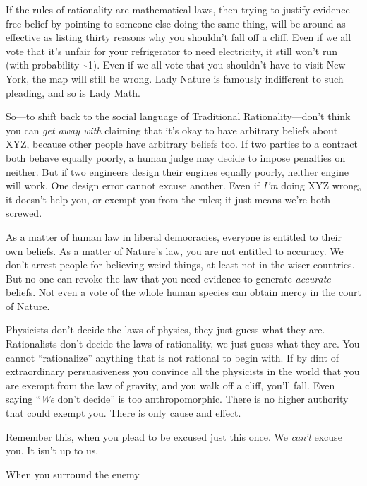 {
 If the rules of rationality are mathematical laws, then trying to
justify evidence-free belief by pointing to someone else doing the same
thing, will be around as effective as listing thirty reasons why you
shouldn't fall off a cliff. Even if we all vote that
it's unfair for your refrigerator to need electricity,
it still won't run (with probability \~{}1). Even if we
all vote that you shouldn't have to visit New York, the
map will still be wrong. Lady Nature is famously indifferent to such
pleading, and so is Lady Math.}

{
 So---to shift back to the social language of Traditional
Rationality---don't think you can \textit{get away
with} claiming that it's okay to have arbitrary beliefs
about XYZ, because other people have arbitrary beliefs too. If two
parties to a contract both behave equally poorly, a human judge may
decide to impose penalties on neither. But if two engineers design
their engines equally poorly, neither engine will work. One design
error cannot excuse another. Even if \textit{I'm} doing
XYZ wrong, it doesn't help you, or exempt you from the
rules; it just means we're both screwed.}

{
 As a matter of human law in liberal democracies, everyone is
entitled to their own beliefs. As a matter of Nature's
law, you are not entitled to accuracy. We don't arrest
people for believing weird things, at least not in the wiser countries.
But no one can revoke the law that you need evidence to generate
\textit{accurate} beliefs. Not even a vote of the whole human species
can obtain mercy in the court of Nature.}

{
 Physicists don't decide the laws of physics, they
just guess what they are. Rationalists don't decide the
laws of rationality, we just guess what they are. You cannot
``rationalize'' anything that is not
rational to begin with. If by dint of extraordinary persuasiveness you
convince all the physicists in the world that you are exempt from the
law of gravity, and you walk off a cliff, you'll fall.
Even saying ``\textit{We} don't
decide'' is too anthropomorphic. There is no higher
authority that could exempt you. There is only cause and effect.}

{
 Remember this, when you plead to be excused just this once. We
\textit{can't} excuse you. It isn't up
to us.}

\myendsectiontext


{
 When you surround the enemy}

